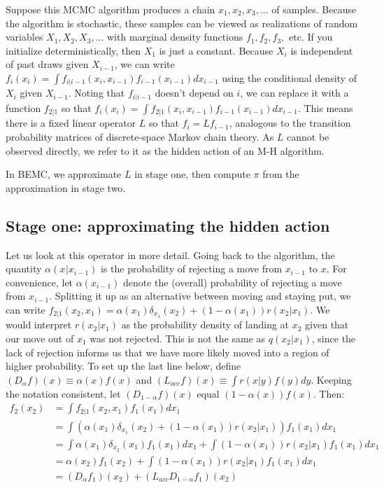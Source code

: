 \documentclass{article}
\begin{document}
Suppose this MCMC algorithm produces a chain $ x_1, x_2, x_3, ...$ of samples. Because the algorithm is stochastic, these samples can be viewed as realizations of random variables $X_1, X_2, X_3, ...$ with marginal density functions $f_1, f_2, f_3, $ etc. If you initialize deterministically, then $X_1$ is just a constant. Because $X_i$ is independent of past draws given $X_{i-1}$, we can write $f_i(x_i) = \int f_{i|i-1}(x_{i},x_{i-1})f_{i-1}(x_{i-1})dx_{i-1}$ using the conditional density of $X_i$ given $X_{i-1}$. Noting that $f_{i|i-1}$ doesn't depend on $i$, we can replace it with a function $f_{2|1}$ so that $f_i(x_i) = \int f_{2|1}(x_i, x_{i-1})f_{i-1}(x_{i-1})dx_{i-1}$. This means there is a fixed linear operator $L$ so that $f_{i} = Lf_{i-1}$, analogous to the transition probability matrices of discrete-space Markov chain theory. As $L$ cannot be observed directly, we refer to it as the hidden action of an M-H algorithm. 

In BEMC, we approximate $L$ in stage one, then compute $\pi$ from the approximation in stage two. 

\subsection{Stage one: approximating the hidden action}

Let us look at this operator in more detail. Going back to the algorithm, the quantity $\alpha(x_{}|x_{i-1})$ is the probability of rejecting a move from $x_{i-1}$ to $x$. For convenience, let $\alpha(x_{i-1})$ denote the (overall) probability of rejecting a move from $x_{i-1}$. Splitting it up as an alternative between moving and staying put, we can write $f_{2|1}(x_2, x_1) = \alpha(x_1)\delta_{x_1}(x_2) + (1-\alpha(x_1))r(x_2|x_1)$. We would interpret $r(x_2|x_1)$ as the probability density of landing at $x_2$ given that our move out of $x_1$ was not rejected. This is not the same as $q(x_2|x_1)$, since the lack of rejection informs us that we have more likely moved into a region of higher probability. To set up the last line below, define $(D_{\alpha}f)(x)\equiv \alpha(x)f(x)$ and $(L_{acc}f)(x)\equiv \int r(x|y)f(y)dy$. Keeping the notation consistent, let $(D_{1-\alpha}f)(x)$ equal $(1-\alpha(x))f(x)$. Then:
\begin{align*}
 f_2(x_2) &= \int f_{2|1}(x_2, x_1)f_1(x_1)dx_1 \\
&= \int (\alpha(x_1)\delta_{x_1}(x_2) + (1-\alpha(x_1))r(x_2|x_1))f_1(x_1)dx_1 \\
&= \int \alpha(x_1)\delta_{x_2}(x_1)f_1(x_1)dx_1 + \int (1-\alpha(x_1))r(x_2|x_1)f_1(x_1)dx_1 \\
&=  \alpha(x_2)f_1(x_2) + \int (1-\alpha(x_1))r(x_2|x_1)f_1(x_1)dx_1 \\
&=  (D_{\alpha}f_1)(x_2) + (L_{acc}D_{1-\alpha}f_1)(x_2) \\
\end{align*}
\end{document}
